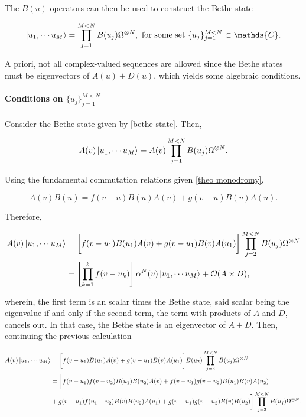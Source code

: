 \documentclass{homework}
\begin{document}
The $B(u)$ operators can then be used to construct the Bethe state

\begin{equation}
    \ket{u_1, \cdots u_M} = \prod_{j=1}^{M < N} B(u_j) \Omega^{\otimes N}, \textnormal{ for some set } \{u_j\}_{j=1}^{M < N} \subset \mathds{C}.
    \label{bethe state}
\end{equation}

A priori, not all complex-valued sequences are allowed since the Bethe states must be eigenvectors of $A(u) + D(u)$, which yields some algebraic conditions. \\

\paragraph{\textbf{Conditions on } $\bigg\{u_j\bigg\}_{j=1}^{M < N}$}

Consider the Bethe state given by \cref{bethe state}. Then, 

\begin{equation*}
    A(v) \ket{u_1, \cdots u_M} = A(v) \prod_{j=1}^{M < N} B(u_j) \Omega^{\otimes N}.
\end{equation*}

Using the fundamental commutation relations given \cref{theo monodromy},

$$
    A(v) B(u) = f(v-u) B(u) A(v) + g(v-u) B(v) A(u).
$$

Therefore,

\begin{equation}
    \begin{split}
        A(v) \ket{u_1, \cdots u_M} &= \bigg[f(v-u_1) B(u_1) A(v) + g(v-u_1) B(v) A(u_1)\bigg] \prod_{j=2}^{M < N} B(u_j) \Omega^{\otimes N} \\
        &= \left[\prod_{k=1}^{\ell} f(v-u_k)\right] \alpha^N(v) \ket{u_1, \cdots u_M} + \mathcal{O}({A \times D}),
    \end{split}
\end{equation}

wherein, the first term is an scalar times the Bethe state, said scalar being the eigenvalue if and only if the second term, the term with products of $A$ and $D$, cancels out. In that case, the Bethe state is an eigenvector of $A + D$. Then, continuing the previous calculation 

\begin{equation}
    \begin{split}
         A(v) \ket{u_1, \cdots u_M} &=  \bigg[f(v-u_1) B(u_1) A(v) + g(v-u_1) B(v) A(u_1)\bigg] B(u_2) \prod_{j=3}^{M < N} B(u_j) \Omega^{\otimes N} \\
         &= \bigg[f(v-u_1)f(v-u_2) B(u_1) B(u_2) A(v) + f(v-u_1)g(v-u_2) B(u_1) B(v) A(u_2) \\
         & + g(v-u_1)f(u_1-u_2) B(v) B(u_2) A(u_1) + g(v-u_1)g(v-u_2) B(v) B(u_2)
         \bigg] \prod_{j=3}^{M < N} B(u_j) \Omega^{\otimes N}. 
    \end{split}
\end{equation}
\end{document}
